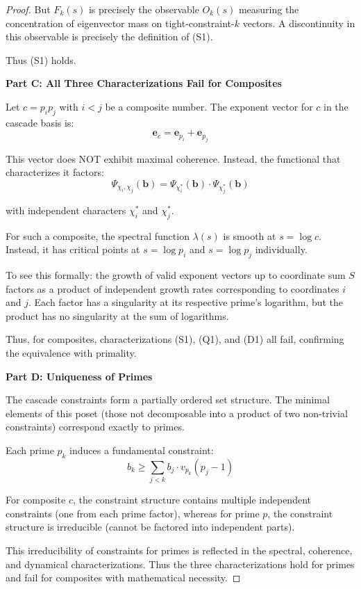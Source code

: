 \begin{proof}
But $F_k(s)$ is precisely the observable $O_k(s)$ measuring the concentration of eigenvector mass on tight-constraint-$k$ vectors. A discontinuity in this observable is precisely the definition of (S1).

Thus (S1) holds.

\noindent \textbf{Part C: All Three Characterizations Fail for Composites}

Let $c = p_i p_j$ with $i < j$ be a composite number. The exponent vector for $c$ in the cascade basis is:
\begin{equation}
\mathbf{e}_c = \mathbf{e}_{p_i} + \mathbf{e}_{p_j}
\end{equation}

This vector does NOT exhibit maximal coherence. Instead, the functional that characterizes it factors:
\begin{equation}
\Psi_{\chi_i, \chi_j}(\mathbf{b}) = \Psi_{\chi^*_i}(\mathbf{b}) \cdot \Psi_{\chi^*_j}(\mathbf{b})
\end{equation}

with independent characters $\chi^*_i$ and $\chi^*_j$.

For such a composite, the spectral function $\lambda(s)$ is smooth at $s = \log c$. Instead, it has critical points at $s = \log p_i$ and $s = \log p_j$ individually.

To see this formally: the growth of valid exponent vectors up to coordinate sum $S$ factors as a product of independent growth rates corresponding to coordinates $i$ and $j$. Each factor has a singularity at its respective prime's logarithm, but the product has no singularity at the sum of logarithms.

Thus, for composites, characterizations (S1), (Q1), and (D1) all fail, confirming the equivalence with primality.

\noindent \textbf{Part D: Uniqueness of Primes}

The cascade constraints form a partially ordered set structure. The minimal elements of this poset (those not decomposable into a product of two non-trivial constraints) correspond exactly to primes.

Each prime $p_k$ induces a fundamental constraint:
\begin{equation}
b_k \geq \sum_{j < k} b_j \cdot v_{p_k}(p_j - 1)
\end{equation}

For composite $c$, the constraint structure contains multiple independent constraints (one from each prime factor), whereas for prime $p$, the constraint structure is irreducible (cannot be factored into independent parts).

This irreducibility of constraints for primes is reflected in the spectral, coherence, and dynamical characterizations. Thus the three characterizations hold for primes and fail for composites with mathematical necessity.

\end{proof}

